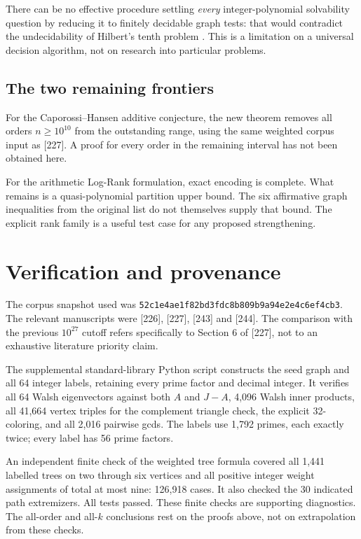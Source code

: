 \documentclass[11pt,a4paper]{article}
\theoremstyle{definition}
\theoremstyle{remark}
\numberwithin{equation}{section}
\begin{document}
There can be no effective procedure settling \emph{every}
integer-polynomial solvability question by reducing it to finitely
decidable graph tests: that would contradict the undecidability of
Hilbert's tenth problem \cite{matiyasevich}. This is a limitation on a
universal decision algorithm, not on research into particular problems.

\subsection{The two remaining frontiers}

For the Caporossi--Hansen additive conjecture, the new theorem removes
all orders $n\ge10^{10}$ from the outstanding range, using the same
weighted corpus input as [227]. A proof for every order in the remaining
interval has not been obtained here.

For the arithmetic Log-Rank formulation, exact encoding is complete.
What remains is a quasi-polynomial partition upper bound. The six
affirmative graph inequalities from the original list do not themselves
supply that bound. The explicit rank family is a useful test case for
any proposed strengthening.

\section{Verification and provenance}

The corpus snapshot used was
\texttt{52c1e4ae1f82bd3fdc8b809b9a94e2e4c6ef4cb3}.
The relevant manuscripts were [226], [227], [243] and [244].
The comparison with the previous $10^{27}$ cutoff refers specifically
to Section 6 of [227], not to an exhaustive literature priority claim.

The supplemental standard-library Python script constructs the seed
graph and all 64 integer labels, retaining every prime factor and
decimal integer. It verifies all 64 Walsh eigenvectors against both
$A$ and $J-A$, 4,096 Walsh inner products, all 41,664 vertex triples for
the complement triangle check, the explicit 32-coloring, and all
2,016 pairwise gcds. The labels use 1,792 primes, each exactly twice;
every label has 56 prime factors.

An independent finite check of the weighted tree formula covered all
1,441 labelled trees on two through six vertices and all positive
integer weight assignments of total at most nine: 126,918 cases.
It also checked the 30 indicated path extremizers.
All tests passed. These finite checks are supporting diagnostics.
The all-order and all-$k$ conclusions rest on the proofs above,
not on extrapolation from these checks.
\end{document}

